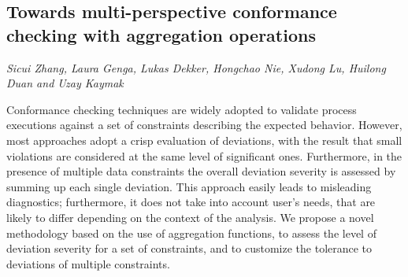 \documentclass[../booklet.tex]{subfiles}
\begin{document}
\subsection[Towards multi-perspective conformance checking with aggregation operations. {\it Sicui Zhang, Laura Genga, Lukas Dekker, Hongchao Nie, Xudong Lu, Huilong Duan and Uzay Kaymak}]{Towards multi-perspective conformance checking with aggregation operations}
      

\begin{center}
  {\it Sicui Zhang, Laura Genga, Lukas Dekker, Hongchao Nie, Xudong Lu, Huilong Duan and Uzay Kaymak}
\end{center}



 Conformance checking techniques are widely adopted to validate process executions against a set of constraints describing the expected behavior. However, most approaches adopt a crisp evaluation of
 deviations, with the result that small violations are considered at the same level of significant ones. %
 Furthermore, in the presence of multiple data constraints the overall deviation severity is assessed by summing up each single deviation. This approach easily leads to misleading diagnostics; furthermore, it does not take into account user's needs, that are likely to differ depending on the context of the analysis.
We propose a novel methodology based on the use of aggregation functions, to assess the level of deviation severity for a set of constraints, and to customize the tolerance to deviations of multiple constraints.
\end{document}
